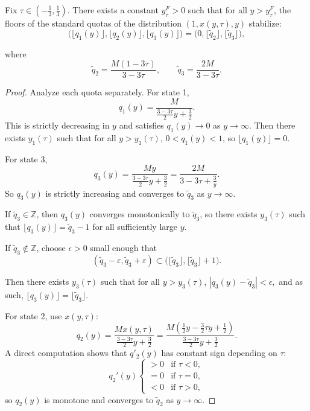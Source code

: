 \documentclass[10pt,a4paper]{amsart}
\begin{document}
\begin{deflem}\label{y_tau.def}
Fix $\tau \in (-\tfrac{1}{3}, \tfrac{1}{3})$. There exists a constant $y_{\tau}^F > 0$ such that for all $y > y_{\tau}^F$, the floors of the standard quotas of the distribution $(1, x(y,\tau), y)$ stabilize:
$$\bigl(\lfloor q_1(y)\rfloor, \lfloor q_2(y)\rfloor, \lfloor q_3(y)\rfloor\bigr)
=\bigl(0, \lfloor \tilde q_2 \rfloor, \lfloor \tilde q_3 \rfloor \bigr),$$

where
$$\tilde q_2 = \frac{M(1-3\tau)}{3-3\tau}, \qquad \tilde q_3 = \frac{2M}{3-3\tau}.$$
\end{deflem}

\begin{proof}
Analyze each quota separately. For state 1,
$$ q_1(y) = \frac{M}{\frac{3-3\tau}{2}y + \frac{3}{2}}.$$
This is strictly decreasing in $y$ and satisfies $q_1(y) \to 0$ as $y \to \infty$. Then there exists $y_1(\tau)$ such that for all $y > y_1(\tau)$,
$0 < q_1(y) < 1$, so $\lfloor q_1(y) \rfloor = 0$.

For state 3, 
$$q_3(y) = \frac{My}{\frac{3-3\tau}{2}y + \frac{3}{2}}= \frac{2M}{3-3\tau + \frac{3}{y}}.$$
So $q_3(y)$ is strictly increasing and converges to $\tilde q_3$ as $y \to \infty$.

If $\tilde q_3 \in \mathbb{Z}$, then $q_3(y)$ converges monotonically to $\tilde q_3$, so there exists $y_3(\tau)$ such that $\lfloor q_3(y) \rfloor = \tilde q_3 - 1$ for all sufficiently large $y$. 

If $\tilde q_3 \notin \mathbb{Z}$, choose $\epsilon > 0$ small enough that
$$(\tilde q_3 - \varepsilon, \tilde q_3 + \varepsilon)
\subset \bigl(\lfloor \tilde q_3 \rfloor, \lfloor \tilde q_3 \rfloor + 1\bigr).$$

Then there exists $y_3(\tau)$ such that for all $y > y_3(\tau)$,
$|q_3(y) - \tilde q_3| < \epsilon,$ and as such, $\lfloor q_3(y) \rfloor = \lfloor \tilde q_3 \rfloor.$


For state 2, use $x(y,\tau)$:
$$
q_2(y) = \frac{Mx(y,\tau)}{\frac{3-3\tau}{2}y + \frac{3}{2}}
= \frac{M\left(\frac{1}{2}y - \frac{3}{2}\tau y + \frac{1}{2}\right)}{\frac{3-3\tau}{2}y + \frac{3}{2}}.
$$
A direct computation shows that $q'_2(y)$ has constant sign depending on $\tau$:
$$q_2'(y)
\begin{cases}
>0 & \text{if } \tau < 0,\\
=0 & \text{if } \tau = 0,\\
<0 & \text{if } \tau > 0,
\end{cases}
$$
so $q_2(y)$ is monotone and converges to $\tilde{q}_2$ as $y \to \infty$.


\end{proof}
\end{document}
